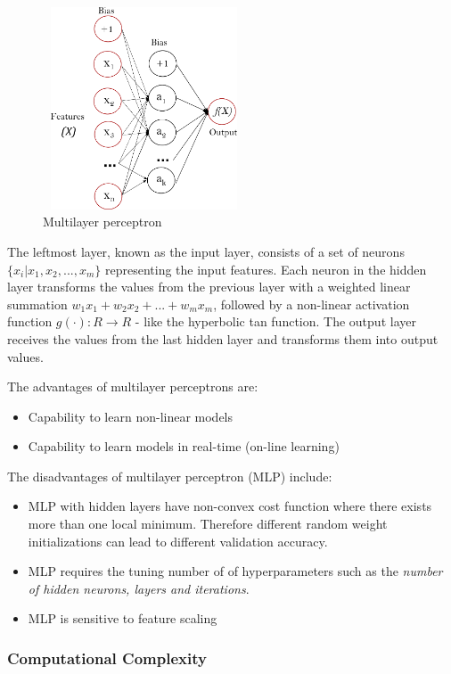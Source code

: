 \begin{figure}[H]
\centering \includegraphics[width = 60mm, height = 60mm]{imgs/multilayerperceptron_network.png}
\caption{Multilayer perceptron}
\label{Fig:mlp_example}
\end{figure}

The leftmost layer, known as the input layer, consists of a set of neurons $\{x_i | x_1, x_2, ..., x_m\}$ representing the input features. Each neuron in the hidden layer transforms the values from the previous layer with a weighted linear summation $w_1x_1 + w_2x_2 + ... + w_mx_m$, followed by a non-linear activation function $g(\cdot):R \rightarrow R$ - like the hyperbolic tan function. The output layer receives the values from the last hidden layer and transforms them into output values.

The advantages of multilayer perceptrons are:
 \begin{itemize}
 \item Capability to learn non-linear models
 \item Capability to learn models in real-time (on-line learning)
 \end{itemize}
 
 The disadvantages of multilayer perceptron (MLP) include:
 \begin{itemize}
 \item MLP with hidden layers have non-convex cost function where there exists more than one local minimum. Therefore different random weight initializations can lead to different validation accuracy.
 \item MLP requires the tuning number of of hyperparameters such as the \textit{number of hidden neurons, layers and iterations}.
 \item MLP is sensitive to feature scaling
 \end{itemize}
 
 \subsubsection{Computational Complexity}
 
